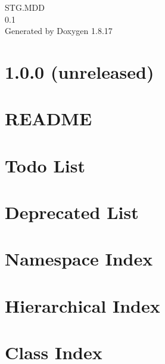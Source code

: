 \let\mypdfximage\pdfximage\def\pdfximage{\immediate\mypdfximage}\documentclass[twoside]{book}
\newcommand{\+}{\discretionary{\mbox{\scriptsize$\hookleftarrow$}}{}{}}
\newcommand{\clearemptydoublepage}{%
  \newpage{\pagestyle{empty}\cleardoublepage}%
}
\begin{document}
\hypersetup{pageanchor=false,
             bookmarksnumbered=true,
             pdfencoding=unicode
            }
\begin{titlepage}
\vspace*{7cm}
\begin{center}%
{\Large S\+T\+G.\+M\+DD \\[1ex]\large 0.\+1 }\\
\vspace*{1cm}
{\large Generated by Doxygen 1.8.17}\\
\end{center}
\end{titlepage}
\clearemptydoublepage
{}
\tableofcontents
\clearemptydoublepage
{}
\hypersetup{pageanchor=true}

\chapter{1.0.0 (unreleased)}
\label{md__root_Desktop_Work_dev_8other_hiredis_CHANGELOG}

\chapter{R\+E\+A\+D\+ME}
\label{md__root_Desktop_Work_dev_8other_hiredis_README}

\chapter{Todo List}
\label{todo}

\chapter{Deprecated List}
\label{deprecated}

\chapter{Namespace Index}

\chapter{Hierarchical Index}

\chapter{Class Index}

\end{document}
